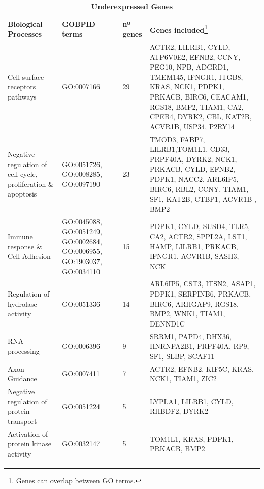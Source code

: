 \documentclass[9pt,twocolumn,twoside]{gsajnl}
\begin{document}
\begin{table}[htbp]
\centering
\caption{\bf Underexpressed Genes}
\begin{tableminipage}{\textwidth}
\begin{tabularx}{\textwidth}{m{3cm}m{3.5cm}m{1.2cm}m{9.2cm}}
\hline
Biological Processes & GOBPID terms & nº genes & Genes included\footnote{Genes can overlap between GO terms.} \\
\hline

Cell surface receptors pathways & GO:0007166 & 29 & ACTR2, LILRB1, CYLD, ATP6V0E2, EFNB2, CCNY, PEG10, NPB, ADGRD1, TMEM145, IFNGR1, ITGB8, KRAS, NCK1, PDPK1, PRKACB, BIRC6, CEACAM1, RGS18, BMP2, TIAM1, CA2, CPEB4, DYRK2, CBL, KAT2B, ACVR1B, USP34, P2RY14\\

Negative regulation of cell cycle, proliferation \& apoptosis& GO:0051726, GO:0008285, GO:0097190 & 23 & TMOD3, FABP7, LILRB1,TOM1L1, CD33, PRPF40A, DYRK2, NCK1, PRKACB, CYLD, EFNB2, PDPK1, NACC2, ARL6IP5, BIRC6, RBL2, CCNY, TIAM1, SF1, KAT2B, CTBP1, ACVR1B , BMP2\\

Immune response \& Cell Adhesion & GO:0045088, GO:0051249, GO:0002684, GO:0006955, GO:1903037, GO:0034110  & 15 & PDPK1, CYLD, SUSD4, TLR5, CA2, ACTR2, SPPL2A, LST1, HAMP, LILRB1, PRKACB, IFNGR1, ACVR1B, SASH3, NCK\\

Regulation of hydrolase activity & GO:0051336 & 14 & ARL6IP5, CST3, ITSN2, ASAP1, PDPK1, SERPINB6, PRKACB, BIRC6, ARHGAP9, RGS18, BMP2, WNK1, TIAM1, DENND1C\\ 

RNA processing & GO:0006396 & 9 & SRRM1, PAPD4, DHX36, HNRNPA2B1, PRPF40A, RP9, SF1, SLBP, SCAF11\\

Axon Guidance & GO:0007411 & 7 & ACTR2, EFNB2, KIF5C, KRAS, NCK1, TIAM1, ZIC2\\

Negative regulation of protein transport & GO:0051224 & 5 & LYPLA1, LILRB1, CYLD, RHBDF2, DYRK2\\

Activation of protein kinase activity & GO:0032147 & 5 & TOM1L1, KRAS, PDPK1, PRKACB, BMP2\\
\hline
\end{tabularx}
  \label{tab:under}
\end{tableminipage}
\end{table}
\end{document}
